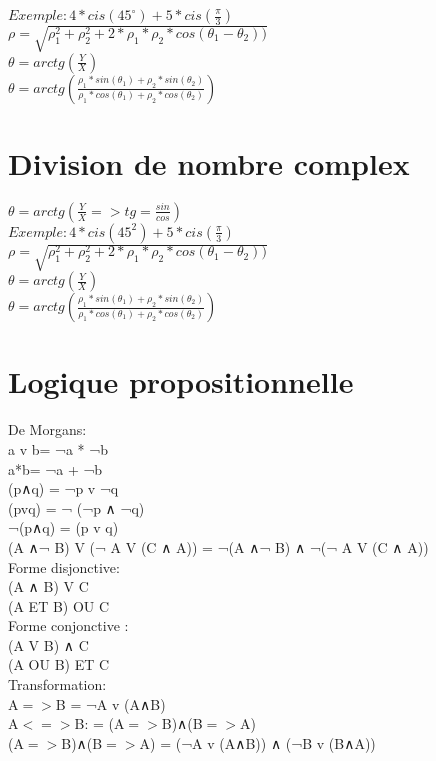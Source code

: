 $ Exemple : 4*cis(45^{\circ}) + 5*cis(\frac{\pi}{3})$\\

$\rho = \sqrt{\rho_1^{2}+\rho_2^{2} + 2 * \rho_1 * \rho_2 * cos(\theta_1-\theta_2))}$ \\

$\theta = arctg(\frac{Y}{X})$\\

$\theta = arctg(\frac{\rho_1 * sin(\theta_1) + \rho_2 * sin(\theta_2)} {\rho_1 * cos(\theta_1) + \rho_2 * cos(\theta_2)})$ \\


\vspace{4mm} %
\section{Division de nombre complex}

$\theta = arctg(\frac{Y}{X} => tg = \frac{sin}{cos} )$ \\

$ Exemple : 4*cis(45^{2}) + 5*cis(\frac{\pi}{3})$\\

$\rho = \sqrt{\rho_1^{2}+\rho_2^{2} + 2 * \rho_1 * \rho_2 * cos(\theta_1-\theta_2))}$ \\

$\theta = arctg(\frac{Y}{X})$\\

$\theta = arctg(\frac{\rho_1 * sin(\theta_1) + \rho_2 * sin(\theta_2)} {\rho_1 * cos(\theta_1) + \rho_2 * cos(\theta_2)})$ \\

\section{Logique propositionnelle}

\vspace{5mm} %
De Morgans: \\
a v b= ¬a * ¬b\\
a*b= ¬a + ¬b\\
(p∧q) = ¬p v ¬q  \\
(pvq) = ¬ (¬p ∧ ¬q)  \\
¬(p∧q) = (p v q)  \\
(A ∧¬ B) V (¬ A V (C ∧ A)) =  ¬(A ∧¬ B) ∧ ¬(¬ A V (C ∧ A))\\

\vspace{5mm} %
Forme disjonctive: \\
(A ∧ B) V C\\
(A ET B) OU C \\

\vspace{5mm} %
Forme conjonctive : \\
(A V B) ∧ C\\
(A OU B) ET C \\

\vspace{5mm} %
Transformation: \\
A$=>$B = ¬A v (A∧B) \\
A$<=>$B: = (A$=>$B)∧(B$=>$A)  \\
(A$=>$B)∧(B$=>$A) = (¬A v (A∧B)) ∧ (¬B v (B∧A))

